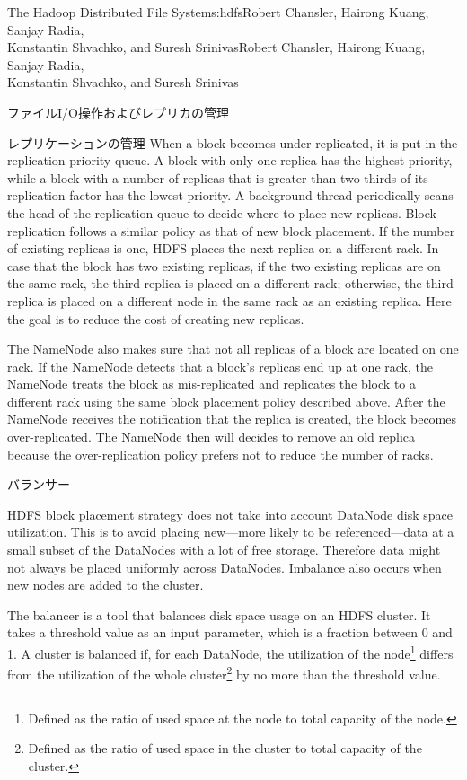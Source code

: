 \begin{aosachaptertoc}{The Hadoop Distributed File System}{s:hdfs}{Robert Chansler, Hairong Kuang, Sanjay Radia, \\ Konstantin Shvachko, and Suresh Srinivas}{Robert Chansler, Hairong Kuang, Sanjay Radia, \\ \hspace*{0.9cm} Konstantin Shvachko, and Suresh Srinivas}
\begin{aosasect1}{ファイルI/O操作およびレプリカの管理}
\begin{aosasect2}{レプリケーションの管理}
When a block becomes under-replicated, it is put in the replication
priority queue. A block with only one replica has the highest
priority, while a block with a number of replicas that is greater than
two thirds of its replication factor has the lowest priority. A
background thread periodically scans the head of the replication queue
to decide where to place new replicas. Block replication follows a
similar policy as that of new block placement. If the number of
existing replicas is one, HDFS places the next replica on a different
rack.  In case that the block has two existing replicas, if the two
existing replicas are on the same rack, the third replica is placed on
a different rack; otherwise, the third replica is placed on a
different node in the same rack as an existing replica. Here the goal
is to reduce the cost of creating new replicas.

The NameNode also makes sure that not all replicas of a block are
located on one rack. If the NameNode detects that a block's replicas
end up at one rack, the NameNode treats the block as mis-replicated
and replicates the block to a different rack using the same block
placement policy described above. After the NameNode receives the
notification that the replica is created, the block becomes
over-replicated. The NameNode then will decides to remove an old
replica because the over-replication policy prefers not to reduce the
number of racks.

\end{aosasect2}

\begin{aosasect2}{バランサー}

HDFS block placement strategy does not take into account DataNode disk
space utilization. This is to avoid placing new---more likely to be
referenced---data at a small subset of the DataNodes with a lot of
free storage. Therefore data might not always be placed uniformly
across DataNodes. Imbalance also occurs when new nodes are added to
the cluster.

The balancer is a tool that balances disk space usage on an HDFS
cluster. It takes a threshold value as an input parameter, which is a
fraction between 0 and 1. A cluster is balanced if, for each DataNode,
the utilization of the node\footnote{Defined as the ratio of used
space at the node to total capacity of the node.} differs from the
utilization of the whole cluster\footnote{Defined as the ratio of used
space in the cluster to total capacity of the cluster.} by no more
than the threshold value.


\end{aosasect2}
\end{aosasect1}
\end{aosachaptertoc}
